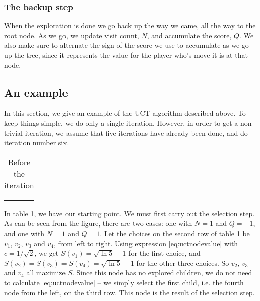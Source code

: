 \subsubsection{The backup step}

When the exploration is done  we go back up the way we came, all the way to the root node.
As we go, we update visit count, $N$, and accumulate the score, $Q$.
We also make sure to alternate the sign of the score we use to accumulate as we go up the tree, since it represents the value for the player who's move it is at that node.

\subsection{An example}
In this section, we give an example of the UCT algorithm described above.
To keep things simple, we do only a single iteration.
However, in order to get a non-trivial iteration, we assume that five iterations have already been done, and do iteration number six.
\begin{center}
\def\arraystretch{5.5}
\begin{table}
\begin{tabular}{l}
  \def\svgwidth{\columnwidth} 
\end{tabular}
\caption{Before the iteration}
\label{tab:mcts_iteration_before}
\end{table}
\end{center}
In table \ref{tab:mcts_iteration_before}, we have our starting point.
We must first carry out the selection step. As can be seen from the figure, there are two cases: one with $N=1$ and $Q=-1$, and one with $N=1$ and $Q=1$.
Let the choices on the second row of table \ref{tab:mcts_iteration_before} be $v_1$, $v_2$, $v_3$ and $v_4$, from left to right.
Using expression \ref{eq:uctnodevalue} with $c = 1/\sqrt{2}$, we get $S(v_1) = \sqrt{\ln{5}} - 1$ for the first choice, and $S(v_2) = S(v_3) = S(v_4) = \sqrt{\ln{5}} + 1$ for the other three choices.
So $v_2$, $v_3$ and $v_4$ all maximize $S$.
Since this node has no explored children, we do not need to calculate \ref{eq:uctnodevalue} -- we simply select the first child, i.e. the fourth node from the left, on the third row.
This node is the result of the selection step.


